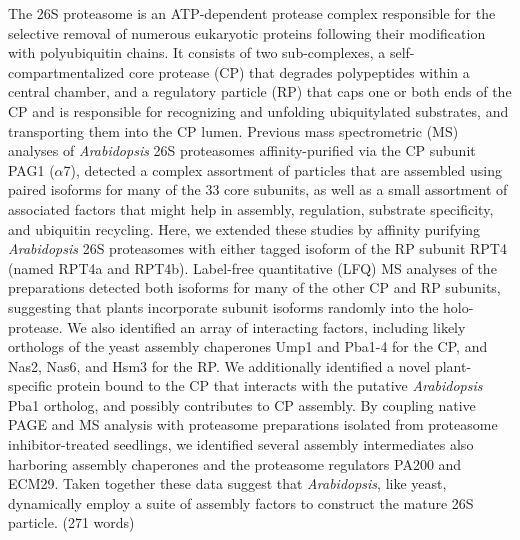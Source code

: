	The 26S proteasome is an ATP-dependent protease complex responsible for the selective removal of numerous eukaryotic proteins following their modification with polyubiquitin chains.  It consists of two sub-complexes, a self-compartmentalized core protease (CP) that degrades polypeptides within a central chamber, and a regulatory particle (RP) that caps one or both ends of the CP and is responsible for recognizing and unfolding ubiquitylated substrates, and transporting them into the CP lumen.  Previous mass spectrometric (MS) analyses of \textit{Arabidopsis} 26S proteasomes affinity-purified via the CP subunit PAG1 ($\alpha$7), detected a complex assortment of particles that are assembled using paired isoforms for many of the 33 core subunits, as well as a small assortment of associated factors that might help in assembly, regulation, substrate specificity, and ubiquitin recycling.  Here, we extended these studies by affinity purifying \textit{Arabidopsis} 26S proteasomes with either tagged isoform of the RP subunit RPT4 (named RPT4a and RPT4b).  Label-free quantitative (LFQ) MS analyses of the preparations detected both isoforms for many of the other CP and RP subunits, suggesting that plants incorporate subunit isoforms randomly into the holo-protease.  We also identified an array of interacting factors, including likely orthologs of the yeast assembly chaperones Ump1 and Pba1-4 for the CP, and Nas2, Nas6, and Hsm3 for the RP.  We additionally identified a novel plant-specific protein bound to the CP that interacts with the putative \textit{Arabidopsis} Pba1 ortholog, and possibly contributes to CP assembly.  By coupling native PAGE and MS analysis with proteasome preparations isolated from proteasome inhibitor-treated seedlings, we identified several assembly intermediates also harboring assembly chaperones and the proteasome regulators PA200 and ECM29.  Taken together these data suggest that \textit{Arabidopsis}, like yeast, dynamically employ a suite of assembly factors to construct the mature 26S particle.  (271 words)
 
